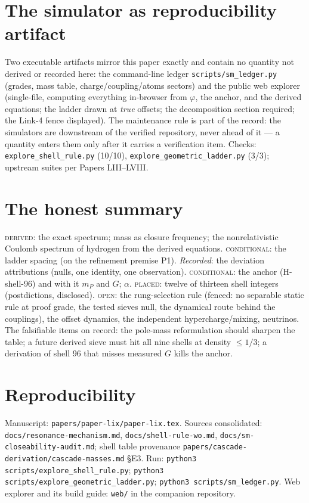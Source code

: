 \documentclass[12pt]{article}
\theoremstyle{definition}
\theoremstyle{remark}
\begin{document}
\section{The simulator as reproducibility artifact}\label{sec:simulator}

Two executable artifacts mirror this paper exactly and contain no quantity not derived or recorded here: the command-line ledger \texttt{scripts/sm\_ledger.py} (grades, mass table, charge/coupling/atoms sectors) and the public web explorer (single-file, computing everything in-browser from $\varphi$, the anchor, and the derived equations; the ladder drawn at \emph{true} offsets; the decomposition section required; the Link-4 fence displayed). The maintenance rule is part of the record: the simulators are downstream of the verified repository, never ahead of it --- a quantity enters them only after it carries a verification item. Checks: \texttt{explore\_shell\_rule.py} (10/10), \texttt{explore\_geometric\_ladder.py} (3/3); upstream suites per Papers LIII--LVIII.

\section{The honest summary}\label{sec:summary}

\textsc{derived}: the exact spectrum; mass as closure frequency; the nonrelativistic Coulomb spectrum of hydrogen from the derived equations. \textsc{conditional}: the ladder spacing (on the refinement premise P1). \emph{Recorded}: the deviation attributions (nulls, one identity, one observation). \textsc{conditional}: the anchor (H-shell-96) and with it $m_P$ and $G$; $\alpha$. \textsc{placed}: twelve of thirteen shell integers (postdictions, disclosed). \textsc{open}: the rung-selection rule (fenced: no separable static rule at proof grade, the tested sieves null, the dynamical route behind the couplings), the offset dynamics, the independent hypercharge/mixing, neutrinos. The falsifiable items on record: the pole-mass reformulation should sharpen the table; a future derived sieve must hit all nine shells at density $\le 1/3$; a derivation of shell 96 that misses measured $G$ kills the anchor.

\section*{Reproducibility}
Manuscript: \texttt{papers/paper-lix/paper-lix.tex}. Sources consolidated: \texttt{docs/resonance-mechanism.md}, \texttt{docs/shell-rule-wo.md}, \texttt{docs/sm-closeability-audit.md}; shell table provenance \texttt{papers/cascade-derivation/cascade-masses.md} \S E3. Run: \texttt{python3 scripts/explore\_shell\_rule.py}; \texttt{python3 scripts/explore\_geometric\_ladder.py}; \texttt{python3 scripts/sm\_ledger.py}. Web explorer and its build guide: \texttt{web/} in the companion repository.



\end{document}
